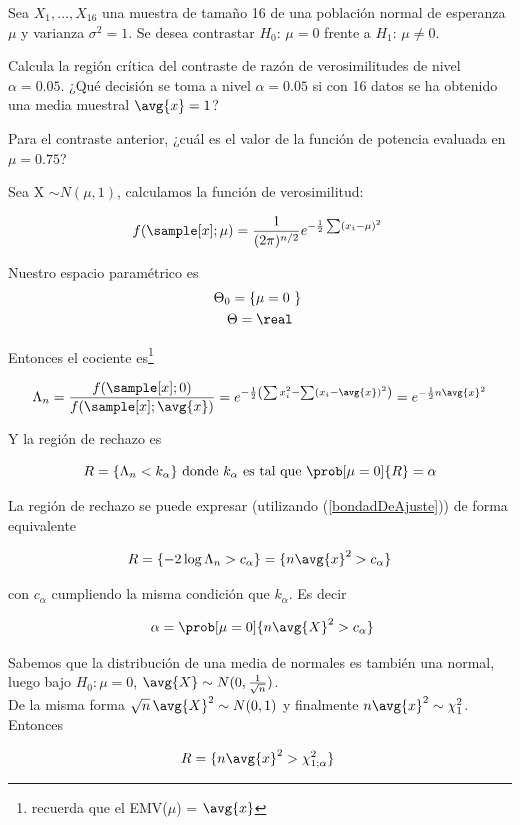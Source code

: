 \pagebreak
\begin{problem}[5]
Sea $X_1,\dotsc, X_{16}$ una muestra de tamaño 16 de una población normal de esperanza $\mu$ y varianza $\sigma^2 = 1$. Se desea contrastar $H_0:\,\mu = 0$ frente a $H_1:\,\mu \neq 0$.

\ppart Calcula la región crítica del contraste de razón de verosimilitudes de nivel $\alpha = 0.05$. ¿Qué decisión se toma a nivel $\alpha = 0.05$ si con 16 datos se ha obtenido una media muestral $\avg{x} = 1$?

\ppart Para el contraste anterior, ¿cuál es el valor de la función de potencia evaluada en $\mu = 0.75$?
\solution

\spart
Sea X $\sim N(\mu, 1)$, calculamos la función de verosimilitud:

\[ f(\sample[x];\mu) = \frac{1}{(2\pi)^{n/2}} e^{-\frac{1}{2}\sum(x_i-\mu)^2} \]

Nuestro espacio paramétrico es 
\begin{gather*}
\Theta_0 = \{ \mu = 0 \} \\
\Theta = \real
\end{gather*}

Entonces el cociente es\footnote{recuerda que el EMV($\mu$) = $\avg{x}$}

\[
\Lambda_n =
\frac{f(\sample[x];0)}{f(\sample[x];\avg{x})} =
e^{-\frac{1}{2} \left(\sum x_i^2 - \sum(x_i - \avg{x})^2 \right)} = 
e^{-\frac{1}{2}n \avg{x}^2}
\]

Y la región de rechazo es

\[ R = \{ \Lambda_n < k_\alpha \} \text{ donde } k_\alpha \text{ es tal que } \prob[\mu = 0]{R} = \alpha \] 

La región de rechazo se puede expresar (utilizando (\ref{bondadDeAjuste})) de forma equivalente

\[ R=\{ -2\log \Lambda_n > c_\alpha\} = \{ n\avg{x}^2> c_\alpha \} \]

con $c_\alpha$ cumpliendo la misma condición que $k_\alpha$. Es decir

\[ \alpha = \prob[\mu=0]{n\avg{X}^2 > c_\alpha} \]

Sabemos que la distribución de una media de normales es también una normal, luego bajo $H_0: \mu = 0$, $\avg{X} \sim N(0,\frac{1}{\sqrt{n}})$.\\
De la misma forma $\sqrt{n} \, \avg{X}^2\sim N(0,1)$ y finalmente $n\avg{x}^2\sim \chi_1^2$. Entonces

\[ R = \{ n \avg{x}^2 > \chi_{1;\alpha}^2 \} \]


\end{problem}
